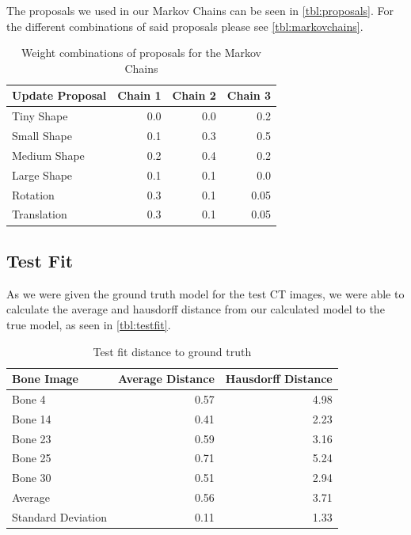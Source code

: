 The proposals we used in our Markov Chains can be seen in \autoref{tbl:proposals}. For the different combinations of said proposals  please see \autoref{tbl:markovchains}.

\begin{table}
  \centering
  \caption{Weight combinations of proposals for the Markov Chains}
  \label{tbl:markovchains}
  \begin{tabular}{lrrr}
    \toprule
      \textbf{Update Proposal} &
      Chain 1 &
      Chain 2 &
      Chain 3 \\
    \midrule
      Tiny Shape & 0.0 & 0.0 & 0.2 \\
      Small Shape & 0.1 & 0.3 & 0.5 \\
      Medium Shape & 0.2 & 0.4 & 0.2 \\
      Large Shape & 0.1 & 0.1 & 0.0 \\
      Rotation & 0.3 & 0.1 & 0.05 \\
      Translation & 0.3 & 0.1 & 0.05 \\
    \bottomrule
  \end{tabular}
\end{table}

\subsection{Test Fit}
\label{subsec:testfit}
As we were given the ground truth model for the test CT images, we were able to calculate the average and hausdorff distance from our calculated model to the true model, as seen in \autoref{tbl:testfit}. 

\begin{table}
  \centering
  \caption{Test fit distance to ground truth}
  \label{tbl:testfit}
  \begin{tabular}{lrr}
    \toprule
      \textbf{Bone Image} &
      Average Distance &
       Hausdorff Distance \\
    \midrule
      Bone 4 & 0.57 & 4.98 \\
      Bone 14 & 0.41 & 2.23 \\
      Bone 23 & 0.59 & 3.16 \\
      Bone 25 & 0.71 & 5.24 \\
      Bone 30 & 0.51 & 2.94 \\
    \midrule
      Average & 0.56 & 3.71 \\
      Standard Deviation & 0.11 & 1.33 \\
    \bottomrule
  \end{tabular}
\end{table}


